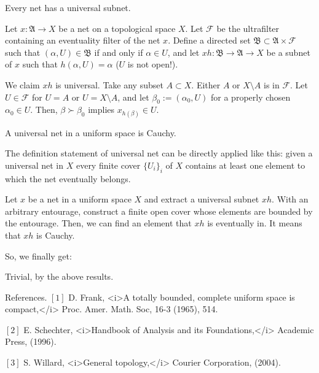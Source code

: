 \documentclass[11pt]{amsart}
\begin{document}
\begin{thm}
Every net has a universal subnet.
\end{thm}
\begin{pf}
Let $x:\mathfrak{A}\to X$ be a net on a topological space $X$.
Let $\mathcal{F}$ be the ultrafilter containing an eventuality filter of the net $x$.
Define a directed set $\mathfrak{B}\subset\mathfrak{A}\times\mathcal{F}$ such that $(\alpha,U)\in\mathfrak{B}$ if and only if $\alpha\in U$, and let $xh:\mathfrak{B}\to\mathfrak{A}\to X$ be a subnet of $x$ such that $h(\alpha,U)=\alpha$ ($U$ is not open!).

We claim $xh$ is universal.
Take any subset $A\subset X$.
Either $A$ or $X\setminus A$ is in $\mathcal{F}$.
Let $U\in\mathcal{F}$ for $U=A$ or $U=X\setminus A$, and let $\beta_0:=(\alpha_0,U)$ for a properly chosen $\alpha_0\in U$.
Then, $\beta\succ\beta_0$ implies $x_{h(\beta)}\in U$.
\end{pf}

\begin{thm}
A universal net in a uniform space is Cauchy.
\end{thm}
\begin{pf}
The definition statement of universal net can be directly applied like this: given a universal net in $X$ every finite cover $\{U_i\}_i$ of $X$ contains at least one element to which the net eventually belongs.

Let $x$ be a net in a uniform space $X$ and extract a universal subnet $xh$.
With an arbitrary entourage, construct a finite open cover whose elements are bounded by the entourage.
Then, we can find an element that $xh$ is eventually in.
It means that $xh$ is Cauchy.
\end{pf}

So, we finally get:

\begin{pf}[3 of Theorem 1.1.]
Trivial, by the above results.
\end{pf}


References.
$[1]$ D. Frank, <i>A totally bounded, complete uniform space is compact,</i> Proc. Amer. Math. Soc, 16-3 (1965), 514.

$[2]$ E. Schechter, <i>Handbook of Analysis and its Foundations,</i> Academic Press, (1996).

$[3]$ S. Willard, <i>General topology,</i> Courier Corporation, (2004).
\end{document}
